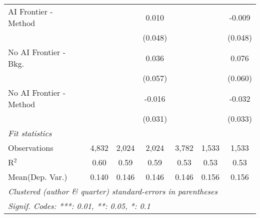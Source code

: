 \begin{tabular}{lcccccc}
   AI Frontier - Method    &               &         & 0.010   &                &              & -0.009\\   
                           &               &         & (0.048) &                &              & (0.048)\\   
   No AI Frontier - Bkg.   &               &         & 0.036   &                &              & 0.076\\   
                           &               &         & (0.057) &                &              & (0.060)\\   
   No AI Frontier - Method &               &         & -0.016  &                &              & -0.032\\   
                           &               &         & (0.031) &                &              & (0.033)\\   
   \midrule
   \emph{Fit statistics}\\
   Observations            & 4,832         & 2,024   & 2,024   & 3,782          & 1,533        & 1,533\\  
   R$^2$                   & 0.60          & 0.59    & 0.59    & 0.53           & 0.53         & 0.53\\  
Mean(Dep. Var.) & 0.140 & 0.146 & 0.146 & 0.146 & 0.156 & 0.156 \\
   \midrule \midrule
   \multicolumn{7}{l}{\emph{Clustered (author \& quarter) standard-errors in parentheses}}\\
   \multicolumn{7}{l}{\emph{Signif. Codes: ***: 0.01, **: 0.05, *: 0.1}}\\
\end{tabular}
\par\endgroup
